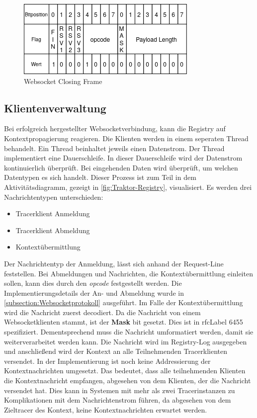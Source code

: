 \begin{figure}[!ht]
	\centering
	\includegraphics[scale=0.8]{img/Implementierung/WebsocketClosingFrame.png}
	\caption[Websocket Closing Frame]{Websocket Closing Frame}
	\label{fig:WebsocketClosingFrame}
\end{figure}


\subsection{Klientenverwaltung}
\label{subsection:Klientenverwaltung}

Bei erfolgreich hergestellter Websocketverbindung, kann die Registry auf Kontextpropagierung reagieren. 
Die Klienten werden in einem seperaten Thread behandelt. 
Ein Thread beinhaltet jeweils einen Datenstrom. 
Der Thread implementiert eine Dauerschleife. 
In dieser Dauerschleife wird der Datenstrom kontinuierlich überprüft. 
Bei eingehenden Daten wird überprüft, um welchen Datentypen es sich handelt. 
Dieser Prozess ist zum Teil in dem Aktivitätsdiagramm, gezeigt in \cref{fig:Traktor-Registry}, visualisiert.
Es werden drei Nachrichtentypen unterschieden:
\begin{itemize}
	\item Tracerklient Anmeldung
	\item Tracerklient Abmeldung
	\item Kontextübermittlung
\end{itemize}

Der Nachrichtentyp der Anmeldung, lässt sich anhand der Request-Line feststellen. 
Bei Abmeldungen und Nachrichten, die Kontextübermittlung einleiten sollen, kann dies durch den \emph{opcode} festgestellt werden.
Die Implementierungsdetails der An- und Abmeldung wurde in \cref{subsection:Websocketprotokoll} ausgeführt. 
Im Falle der Kontextübermittlung wird die Nachricht zuerst decodiert. 
Da die Nachricht von einem Websocketklienten stammt, ist der \textbf{Mask} bit gesetzt. 
Dies ist in \gls{rfcLabel} 6455 spezifiziert. 
Dementsprechend muss die Nachricht umformatiert werden, damit sie weiterverarbeitet werden kann. Die Nachricht wird im Registry-Log ausgegeben und anschließend wird der Kontext an alle Teilnehmenden Tracerklienten versendet. In der Implementierung ist noch keine Addressierung der Kontextnachrichten umgesetzt. Das bedeutet, dass alle teilnehmenden Klienten die Kontextnachricht empfangen, abgesehen von dem Klienten, der die Nachricht versendet hat. Dies kann in Systemen mit mehr als zwei Tracerinstanzen zu Komplikationen mit dem Nachrichtenstrom führen, da abgesehen von dem Zieltracer des Kontext, keine Kontextnachrichten erwartet werden.

